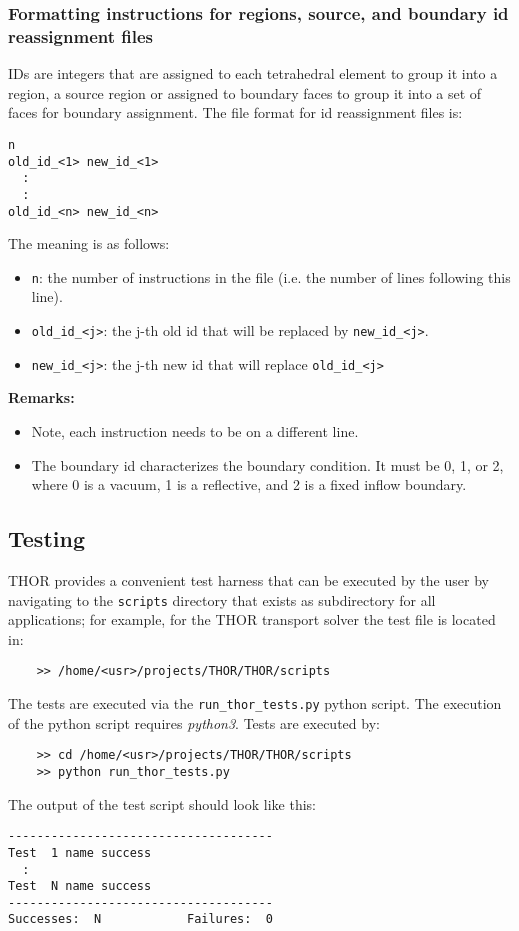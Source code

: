 \subsubsection{Formatting instructions for regions, source, and boundary id reassignment files}\label{sec:reassign_file_format}
IDs are integers that are assigned to each tetrahedral element to group it into a region, a source region or assigned to boundary
faces to group it into a set of faces for boundary assignment.
The file format for id reassignment files is:
\begin{verbatim}
n
old_id_<1> new_id_<1>
  :
  :
old_id_<n> new_id_<n>
\end{verbatim}
The meaning is as follows:
\begin{itemize}
    \item \verb"n": the number of instructions in the file (i.e. the number of lines following this line).
    \item \verb"old_id_<j>": the j-th old id that will be replaced by \verb"new_id_<j>".
    \item \verb"new_id_<j>": the j-th new id that will replace \verb"old_id_<j>"
\end{itemize}
\textbf{Remarks:}
\begin{itemize}
    \item Note, each instruction needs to be on a different line.
    \item The boundary id characterizes the boundary condition. It must be 0, 1, or 2, where 0 is a vacuum, 1 is a reflective, and 2 is a fixed inflow boundary.
\end{itemize}

\subsection{Testing}
THOR provides a convenient test harness that can be executed by the user by navigating to the \verb"scripts" directory that exists as subdirectory for all applications; for example, for the THOR transport solver the test file is located in:
\begin{verbatim}
    >> /home/<usr>/projects/THOR/THOR/scripts
\end{verbatim}
The tests are executed via the \verb"run_thor_tests.py" python script. The execution of the python script requires \textit{python3}. Tests are executed by:
\begin{verbatim}
    >> cd /home/<usr>/projects/THOR/THOR/scripts
    >> python run_thor_tests.py 
\end{verbatim}
The output of the test script should look like this:
\begin{verbatim}
-------------------------------------
Test  1 name success
  :
Test  N name success
-------------------------------------
Successes:  N            Failures:  0
\end{verbatim}